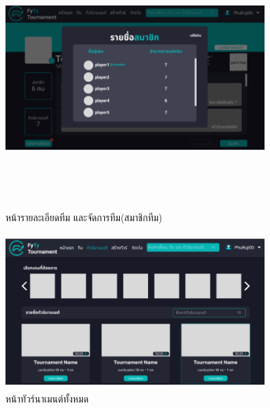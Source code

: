 \begin{figure}[h]
  \begin{center}
  \includegraphics[width=10cm,height=10cm,keepaspectratio]{member.png}
  \end{center}
  \caption[หน้ารายละเอียดทีม และจัดการทีม(สมาชิกทีม)]{หน้ารายละเอียดทีม และจัดการทีม(สมาชิกทีม)}
  \label{fig:หน้ารายละเอียดทีม และจัดการทีม(สมาชิกทีม)}
\end{figure}

\begin{figure}[h]
  \begin{center}
  \includegraphics[width=10cm,height=6cm,keepaspectratio]{allTour.png}
  \end{center}
  \caption[หน้าทัวร์นาเมนต์ทั้งหมด]{หน้าทัวร์นาเมนต์ทั้งหมด}
  \label{fig:หน้าทัวร์นาเมนต์ทั้งหมด}
\end{figure}

